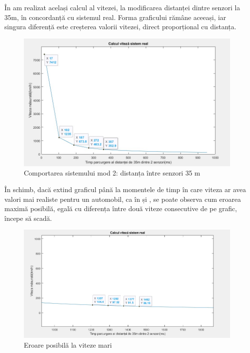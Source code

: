 În  am realizat același calcul al vitezei, la modificarea distanței dintre senzori la 35m, în concordanță cu sistemul real. Forma graficului rămâne aceeași, iar singura diferență este creșterea valorii vitezei, direct proporțional cu distanța. 

\begin{figure}[!ht]
    \begin{center}
    \includegraphics[width=0.9\linewidth,keepaspectratio]{pics/v2.jpg}
    \end{center}
    \caption{Comportarea sistemului mod 2: distanța între senzori 35 m}
    \label{fig:v2}
\end{figure}

În schimb, dacă extind graficul până la momentele de timp în care viteza ar avea valori mai realiste pentru un automobil, ca în  și , se poate observa cum eroarea maximă posibilă, egală cu diferența între două viteze consecutive de pe grafic, începe să scadă. 

\begin{figure}[!ht]
    \begin{center}
    \includegraphics[scale = 0.5]{pics/vmare.jpg}
    \end{center}
    \caption{Eroare posibilă la viteze mari}
    \label{fig:vmare}
\end{figure}

